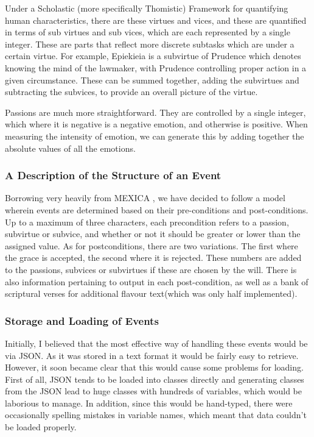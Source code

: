 \documentclass[11pt]{article}
\begin{document}
Under a Scholastic (more specifically Thomistic) Framework for quantifying human characteristics, there are these virtues and vices, and these are quantified in terms of sub virtues and sub vices, which are each represented by a single integer. These are parts that reflect more discrete subtasks which are under a certain virtue. For example, Epiekieia is a subvirtue of Prudence which denotes knowing the mind of the lawmaker, with Prudence controlling proper action in a given circumstance. These can be summed together, adding the subvirtues and subtracting the subvices, to provide an overall picture of the virtue.

Passions are much more straightforward. They are controlled by a single integer, which where it is negative is a negative emotion, and otherwise is positive. When measuring the intensity of emotion, we can generate this by adding together the absolute values of all the emotions.\\

\subsubsection{A Description of the Structure of an Event}
Borrowing very heavily from MEXICA \cite{MEXICA}, we have decided to follow a model wherein events are determined based on their pre-conditions and post-conditions. Up to a maximum of three characters, each precondition refers to a passion, subvirtue or subvice, and whether or not it should be greater or lower than the assigned value. As for postconditions, there are two variations. The first where the grace is accepted, the second where it is rejected. These numbers are added to the passions, subvices or subvirtues if these are chosen by the will. There is also information pertaining to output in each post-condition, as well as a bank of scriptural verses for additional flavour text(which was only half implemented).

\subsubsection{Storage and Loading of Events} 
Initially, I believed that the most effective way of handling these events would be via JSON. As it was stored in a text format it would be fairly easy to retrieve. However, it soon became clear that this would cause some problems for loading. First of all, JSON tends to be loaded into classes directly and generating classes from the JSON lead to huge classes with hundreds of variables, which would be laborious to manage. In addition, since this would be hand-typed, there were occasionally spelling mistakes in variable names, which meant that data couldn't be loaded properly.\\
\end{document}
